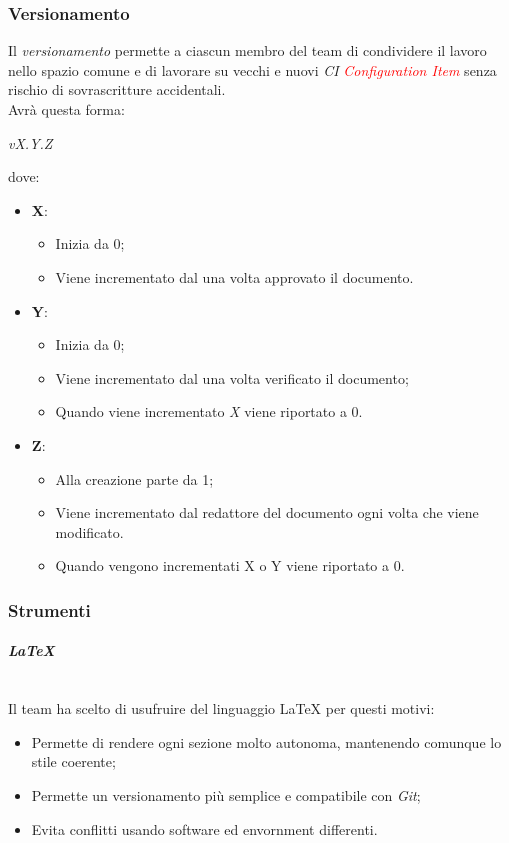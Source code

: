 	\subsubsection{Versionamento}
	Il \emph{versionamento} permette a ciascun membro del team di condividere il lavoro nello spazio comune e di lavorare su vecchi e nuovi \emph{CI} \emph{\textcolor{red}{Configuration Item}} senza rischio di sovrascritture accidentali.
	\\Avrà questa forma:
	\begin{center}
		\emph{vX.Y.Z}
	\end{center}
	dove:
	\begin{itemize}
		\item \textbf{X}:
		\begin{itemize}
			\item Inizia da 0;
			\item Viene incrementato dal \RdP{} una volta approvato il documento.
		\end{itemize}
		\item \textbf{Y}:
		\begin{itemize}
			\item Inizia da 0;
			\item Viene incrementato dal \ver{} una volta verificato il documento;
			\item Quando viene incrementato \emph{X} viene riportato a 0.
		\end{itemize}
		\item \textbf{Z}:
		\begin{itemize}
			\item Alla creazione parte da 1;
			\item Viene incrementato dal redattore del documento ogni volta che viene modificato.
			\item Quando vengono incrementati X o Y viene riportato a 0.
		\end{itemize}
	\end{itemize}
	\subsubsection{Strumenti}
			\paragraph{\textbf{\emph{\LaTeX}}}
			~\\Il team ha scelto di usufruire del linguaggio \LaTeX{} per questi motivi:
			\begin{itemize}
				\item Permette di rendere ogni sezione molto autonoma, mantenendo comunque lo stile coerente;
				\item Permette un versionamento più semplice e compatibile con \emph{Git};
				\item Evita conflitti usando software ed envornment differenti.
			\end{itemize}
